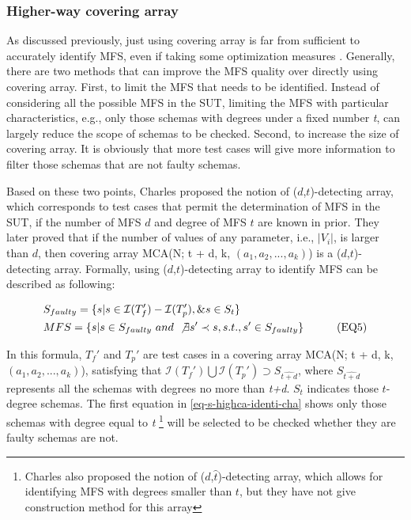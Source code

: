 \documentclass[10pt,journal,cspaper,compsoc]{IEEEtran}
\begin{document}
\subsubsection{Higher-way covering array}
As discussed previously, just using covering array is far from sufficient to accurately identify MFS, even if taking some optimization measures \cite{yilmaz2006covering,zhang2012faulty}. Generally, there are two methods that can improve the MFS quality over directly using covering array. First, to limit the MFS that needs to be identified. Instead of considering all the possible MFS in the SUT, limiting the MFS with particular characteristics, e.g., only those schemas with degrees under a fixed number \emph{t}, can largely reduce the scope of schemas to be checked. Second, to increase the size of covering array. It is obviously that more test cases will give more information to filter those schemas that are not faulty schemas.

Based on these two points, Charles \cite{colbourn2008locating} proposed the notion of ($d$,$t$)-detecting array, which corresponds to test cases that permit the determination of MFS in the SUT, if the number of MFS $d$ and degree of MFS $t$ are known in prior. They  later proved that if the number of values of any parameter, i.e., $|V_{i}|$, is larger than $d$, then covering array MCA(N; t + d, k, $(a_{1}, a_{2}, ..., a_{k})$) is a ($d$,$t$)-detecting array. Formally, using ($d$,$t$)-detecting array to identify MFS can be described as following:

\begin{alignat}{2}
 &  S_{faulty} = \{ s | s \in \mathcal{I}(T_{f}') - \mathcal{I}(T_{p}'), \& s \in S_{t}  \}  &{}&   \nonumber \\
& MFS =  \{s | s \in S_{faulty}\ and\ \not\exists s' \prec s, s.t., s' \in S_{faulty}\} &{}& \tag{EQ5} \label{eq-s-highca-identi-cha} \nonumber
\end{alignat}

In this formula, $T_{f}'$ and $T_{p}'$ are test cases in a covering array MCA(N; t + d, k, $(a_{1}, a_{2}, ..., a_{k})$), satisfying that $ \mathcal{I}(T_{f}') \bigcup \mathcal{I}(T_{p}') \supset S_{\hat{t+d}}$, where $S_{\hat{t+d}}$ represents all the schemas with degrees no more than \emph{t+d}. $S_{t}$ indicates those $t$-degree schemas. The first equation in \ref{eq-s-highca-identi-cha} shows only those schemas with degree equal to \emph{t} \footnote{Charles also proposed the notion of ($d$,$\hat{t}$)-detecting array, which allows for identifying MFS with degrees smaller than $t$, but they have not give construction method for this array} will be selected to be checked whether they are faulty schemas are not.
\end{document}

